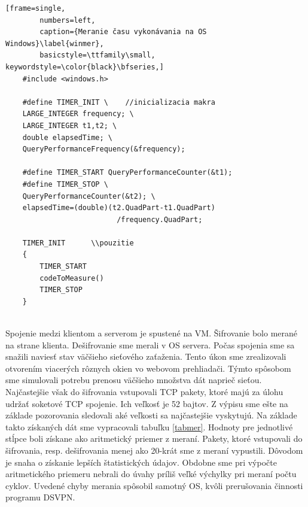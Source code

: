 \begin{minipage}{\linewidth} 	
	\begin{lstlisting}[frame=single,
		numbers=left,
		caption={Meranie času vykonávania na OS Windows}\label{winmer},
		basicstyle=\ttfamily\small, keywordstyle=\color{black}\bfseries,]
	#include <windows.h>
	
	#define TIMER_INIT \	//inicializacia makra
	LARGE_INTEGER frequency; \
	LARGE_INTEGER t1,t2; \
	double elapsedTime; \
	QueryPerformanceFrequency(&frequency);

	#define TIMER_START QueryPerformanceCounter(&t1);
	#define TIMER_STOP \
	QueryPerformanceCounter(&t2); \
	elapsedTime=(double)(t2.QuadPart-t1.QuadPart)
						  /frequency.QuadPart; 	
	
	TIMER_INIT		\\pouzitie	
	{
		TIMER_START
		codeToMeasure()
	 	TIMER_STOP
 	}
	\end{lstlisting}
\end{minipage}\\

Spojenie medzi klientom a serverom je spustené na VM. Šifrovanie bolo merané na strane klienta. Dešifrovanie sme merali v OS servera. Počas spojenia sme sa snažili naviesť stav väčšieho sieťového zaťaženia. Tento úkon sme zrealizovali otvorením viacerých rôznych okien vo webovom prehliadači. Týmto spôsobom sme simulovali potrebu prenosu väčšieho množstva dát naprieč sieťou. Najčastejšie však do šifrovania vstupovali TCP pakety, ktoré majú za úlohu udržať soketové TCP spojenie. Ich veľkosť je 52 bajtov. Z výpisu sme ešte na základe pozorovania sledovali aké veľkosti sa najčastejšie vyskytujú. Na základe takto získaných dát sme vypracovali tabuľku \ref{tabmer}. Hodnoty pre jednotlivé stĺpce boli získane ako aritmetický priemer z meraní. Pakety, ktoré vstupovali do šifrovania, resp. dešifrovania menej ako 20-krát sme z meraní vypustili. Dôvodom je snaha o získanie lepších štatistických údajov. Obdobne sme pri výpočte aritmetického priemeru nebrali do úvahy príliš veľké výchylky pri meraní počtu cyklov. Uvedené chyby merania spôsobil samotný OS, kvôli prerušovania činnosti programu DSVPN.     

